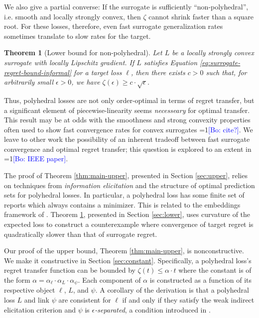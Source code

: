 \documentclass{article}
\newtheorem{theorem}{Theorem}
\theoremstyle{definition}\newtheorem{definition}{Definition}
\theoremstyle{definition}\newtheorem{assumption}{Assumption}
\newcommand{\Comments}{1}
\newcommand{\mynote}[2]{\ifnum\Comments=1\textcolor{#1}{#2}\fi}
\newcommand{\bo}[1]{\mynote{blue}{[Bo: #1]}}
\begin{document}
We also give a partial converse: If the surrogate is sufficiently ``non-polyhedral'', i.e. smooth and locally strongly convex, then $\zeta$ cannot shrink faster than a square root.
For these losses, therefore, even fast surrogate generalization rates sometimes translate to slow rates for the target.
\begin{theorem}[Lower bound for non-polyhedral]
  \label{thm:main-lower}
  Let $L$ be a locally strongly convex surrogate with locally Lipschitz gradient.
  If $L$ satisfies Equation \ref{eq:surrogate-regret-bound-informal} for a target loss $\ell$, then there exists $c>0$ such that, for arbitrarily small $\epsilon>0$, we have $\zeta(\epsilon) \geq c\cdot\sqrt{\epsilon}$.
\end{theorem}
Thus, polyhedral losses are not only order-optimal in terms of regret transfer, but a significant element of piecewise-linearity seems \emph{necesseary} for optimal transfer.
This result may be at odds with the smoothness and strong convexity properties often used to show fast convergence rates for convex surrogates \bo{cite?}.
We leave to other work the possibility of an inherent tradeoff between fast surrogate convergence and optimal regret transfer; this question is explored to an extent in \bo{IEEE paper}.

The proof of Theorem \ref{thm:main-upper}, presented in Section \ref{sec:upper}, relies on techniques from \emph{information elicitation} and the structure of optimal prediction sets for polyhedral losses.
In particular, a polyhedral loss has some finite set of reports which always contains a minimizer.
This is related to the embeddings framework of \cite{finocchiaro2020embedding}.
Theorem \ref{thm:main-lower}, presented in Section \ref{sec:lower}, uses curvature of the expected loss to construct a counterexample where convergence of target regret is quadratically slower than that of surrogate regret.

Our proof of the upper bound, Theorem \ref{thm:main-upper}, is nonconstructive.
We make it constructive in Section \ref{sec:constant}.
Specifically, a polyhedral loss's regret transfer function can be bounded by $\zeta(t) \leq \alpha \cdot t$ where the constant is of the form $\alpha = \alpha_{\ell} \cdot \alpha_L \cdot \alpha_{\psi}$.
Each component of $\alpha$ is constructed as a function of its respective object $\ell$, $L$, and $\psi$.
A corollary of the derivation is that a polyhedral loss $L$ and link $\psi$ are consistent for $\ell$ if and only if they satisfy the weak indirect elicitation criterion and $\psi$ is \emph{$\epsilon$-separated}, a condition introduced in \cite{finocchiaro2020embedding}.
\end{document}
